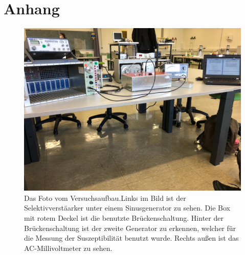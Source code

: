 \section{Anhang}
\label{sec:Anhang}
\begin{figure}
    \centering
    \includegraphics[width=\textwidth]{content/index.jpeg}
    \caption{Das Foto vom Versuchsaufbau.Links im Bild ist der Selektivverstäarker unter einem Sinusgenerator zu sehen. 
    Die Box mit rotem Deckel ist die benutzte Brückenschaltung. 
    Hinter der Brückenschaltung ist der zweite Generator zu erkennen, welcher für die Messung der Suszeptibilität benutzt wurde.
    Rechts außen ist das AC-Millivoltmeter zu sehen.}
    \label{fig:datenselektiv1}
\end{figure}
